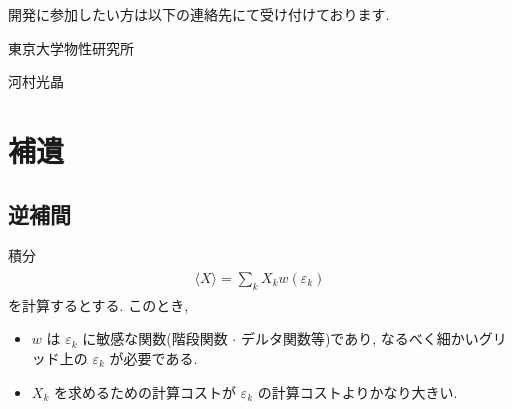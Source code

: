 \documentclass[letterpaper,10pt,dvipdfmx,openany]{sphinxmanual}
\begin{document}
\sphinxAtStartPar
開発に参加したい方は以下の連絡先にて受け付けております.

\sphinxAtStartPar
東京大学物性研究所

\sphinxAtStartPar
河村光晶

\sphinxAtStartPar
{}

\sphinxstepscope


\chapter{補遺}
\label{\detokenize{app:app}}\label{\detokenize{app:id1}}\label{\detokenize{app::doc}}

\section{逆補間}
\label{\detokenize{app:id2}}
\sphinxAtStartPar
積分
\begin{equation*}
\begin{split}\begin{align}
\langle X \rangle = \sum_{k} X_k w(\varepsilon_k)
\end{align}\end{split}
\end{equation*}
\sphinxAtStartPar
を計算するとする. このとき,
\begin{itemize}
\item {} 
\sphinxAtStartPar
\(w\) は \(\varepsilon_k\) に敏感な関数(階段関数 \(\cdot\) デルタ関数等)であり,
なるべく細かいグリッド上の \(\varepsilon_k\) が必要である.

\item {} 
\sphinxAtStartPar
\(X_k\) を求めるための計算コストが \(\varepsilon_k\) の計算コストよりかなり大きい.

\end{itemize}
\end{document}
